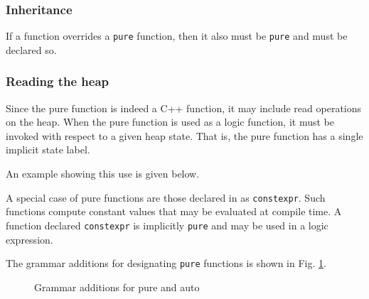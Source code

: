 \subsubsection{Inheritance}
If a function overrides a \lstinline|pure| function, then it also must be \lstinline|pure| and must be declared so.

\subsubsection*{Reading the heap}
Since the pure function is indeed a C++ function, it may include read operations on the heap. When the pure function is used as a logic function,
it must be invoked with respect to a given heap state. 
That is, the pure function has a single implicit state label.


An example showing this use is given below.



A special case of pure functions are those declared in \lang as \lstinline|constexpr|.
Such functions compute constant values that may be evaluated at compile time. A function declared \lstinline|constexpr| is implicitly \lstinline|pure| and may be used in a logic expression.

The grammar additions for designating \lstinline|pure| functions is shown in Fig. \ref{fig:gram:pure}.


\begin{figure}
\begin{cadre}

\end{cadre}
\caption{Grammar additions for pure and auto}
\label{fig:gram:pure}
\end{figure}

